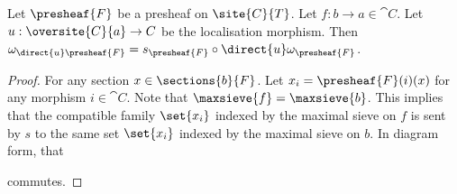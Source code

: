 \begin{lemma}
Let $\presheaf{F}$ be a presheaf on $\site{C}{T}$.
Let $f:b\rightarrow a \in \cat{C}$.
Let $u:\oversite{C}{a} \rightarrow C$ be the localisation morphism.
Then $\omega_{\direct{u} \presheaf{F}} = s_{\presheaf{F}} \circ \direct{u}\omega_{\presheaf{F}}$.
\end{lemma}

\begin{proof}
For any section $x \in \sections{b}{F}$.
Let $x_i = \presheaf{F}(i)(x)$ for any morphism $i \in \cat{C}$. 
Note that $\maxsieve{f} = \maxsieve{b}$.
This implies that the compatible family $\set{x_i}$ indexed by the maximal sieve on $f$
is sent by $s$ to the same set $\set{x_i}$ indexed by the maximal sieve on $b$.
In diagram form, that

\begin{center}
\end{center}

commutes.
\end{proof}